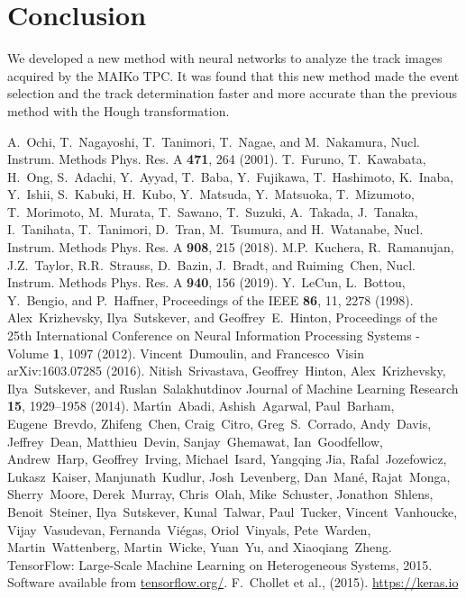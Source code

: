 \documentclass{jps-cp}
\begin{document}
\section{Conclusion}
We developed a new method with neural networks to analyze the track images acquired by the MAIKo TPC.
It was found that this new method made the event selection and the track determination faster and more accurate
than the previous method with the Hough transformation.

\begin{thebibliography}{9}
  A.~Ochi, T.~Nagayoshi, T.~Tanimori, T.~Nagae, and M.~Nakamura,
  Nucl. Instrum. Methods Phys. Res. A \textbf{471}, 264 (2001).
  T.~Furuno, T.~Kawabata, H.~Ong, S.~Adachi, Y.~Ayyad, T.~Baba, Y.~Fujikawa, T.~Hashimoto, K.~Inaba, Y.~Ishii,
  S.~Kabuki, H.~Kubo, Y.~Matsuda, Y.~Matsuoka, T.~Mizumoto, T.~Morimoto, M.~Murata, T.~Sawano, T.~Suzuki, A.~Takada,
  J.~Tanaka, I.~Tanihata, T.~Tanimori, D.~Tran, M.~Tsumura, and H.~Watanabe,
  Nucl. Instrum. Methods Phys. Res. A \textbf{908}, 215 (2018).
  M.P.~Kuchera, R.~Ramanujan, J.Z.~Taylor, R.R.~Strauss, D.~Bazin, J.~Bradt,
  and Ruiming~Chen, 
  Nucl. Instrum. Methods Phys. Res. A \textbf{940}, 156 (2019).
  Y.~LeCun, L.~Bottou, Y.~Bengio, and P.~Haffner,
  Proceedings of the IEEE \textbf{86}, 11, 2278 (1998).
  Alex~Krizhevsky, Ilya~Sutskever, and Geoffrey~E.~Hinton,
  Proceedings of the 25th International Conference on Neural Information Processing Systems - Volume \textbf{1}, 1097 (2012).
  Vincent~Dumoulin, and Francesco~Visin
  arXiv:1603.07285 (2016).
  Nitish~Srivastava, Geoffrey~Hinton, Alex~Krizhevsky, Ilya~Sutskever, and Ruslan~Salakhutdinov
  Journal of Machine Learning Research \textbf{15}, 1929--1958 (2014).
  Mart\'{\i}n~Abadi,
  Ashish~Agarwal,
  Paul~Barham,
  Eugene~Brevdo,
  Zhifeng~Chen,
  Craig~Citro,
  Greg~S.~Corrado,
  Andy~Davis,
  Jeffrey~Dean,
  Matthieu~Devin,
  Sanjay~Ghemawat,
  Ian~Goodfellow,
  Andrew~Harp,
  Geoffrey~Irving,
  Michael~Isard,
  Yangqing Jia,
  Rafal~Jozefowicz,
  Lukasz~Kaiser,
  Manjunath~Kudlur,
  Josh~Levenberg,
  Dan~Man\'{e},
  Rajat~Monga,
  Sherry~Moore,
  Derek~Murray,
  Chris~Olah,
  Mike~Schuster,
  Jonathon~Shlens,
  Benoit~Steiner,
  Ilya~Sutskever,
  Kunal~Talwar,
  Paul~Tucker,
  Vincent~Vanhoucke,
  Vijay~Vasudevan,
  Fernanda~Vi\'{e}gas,
  Oriol~Vinyals,
  Pete~Warden,
  Martin~Wattenberg,
  Martin~Wicke,
  Yuan~Yu, and
  Xiaoqiang~Zheng.
  {{TensorFlow}: Large-Scale Machine Learning on Heterogeneous Systems},
  2015.
  Software available from \url{tensorflow.org/}.
  F.~Chollet et al., (2015). \url{https://keras.io}
\end{thebibliography}
\end{document}
